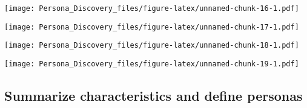 \documentclass[]{article}
\newenvironment{Shaded}{\begin{snugshade}}{\end{snugshade}}
\newcommand{\KeywordTok}[1]{\textcolor[rgb]{0.13,0.29,0.53}{\textbf{{#1}}}}
\newcommand{\DataTypeTok}[1]{\textcolor[rgb]{0.13,0.29,0.53}{{#1}}}
\newcommand{\StringTok}[1]{\textcolor[rgb]{0.31,0.60,0.02}{{#1}}}
\newcommand{\NormalTok}[1]{{#1}}
\begin{document}
\texttt{[image: Persona\_Discovery\_files/figure-latex/unnamed-chunk-16-1.pdf]}

\begin{Shaded}
\end{Shaded}

\texttt{[image: Persona\_Discovery\_files/figure-latex/unnamed-chunk-17-1.pdf]}

\begin{Shaded}
\end{Shaded}

\texttt{[image: Persona\_Discovery\_files/figure-latex/unnamed-chunk-18-1.pdf]}

\begin{Shaded}
\end{Shaded}

\texttt{[image: Persona\_Discovery\_files/figure-latex/unnamed-chunk-19-1.pdf]}

\subsection{Summarize characteristics and define
personas}\label{summarize-characteristics-and-define-personas}
\end{document}
